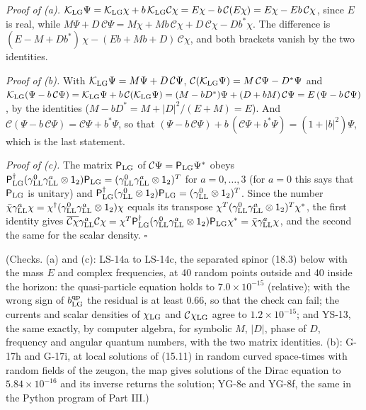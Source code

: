 \documentclass[
  10pt,
]{article}
\begin{document}
\emph{Proof of (a).}
\(\mathcal K_{\rm LG}\Psi=\mathcal K_{\rm LG}\chi+b\,\mathcal K_{\rm LG}\mathcal C\chi=E\chi-b\,\mathcal C(E\chi)=E\chi-Eb\,\mathcal C\chi\),
since \(E\) is real, while
\(M\Psi+D\,\mathcal C\Psi=M\chi+Mb\,\mathcal C\chi+D\,\mathcal C\chi-Db^*\chi\).
The difference is \((E-M+Db^*)\,\chi-(Eb+Mb+D)\,\mathcal C\chi\), and
both brackets vanish by the two identities.

\emph{Proof of (b).} With
\(\mathcal K_{\rm LG}\Psi=M\Psi+D\,\mathcal C\Psi\),
\(\mathcal C(\mathcal K_{\rm LG}\Psi)=M\,\mathcal C\Psi-D^*\Psi\) and
\(\mathcal K_{\rm LG}(\Psi-b\,\mathcal C\Psi)=\mathcal K_{\rm LG}\Psi+b\,\mathcal C(\mathcal K_{\rm LG}\Psi)=(M-bD^*)\Psi+(D+bM)\,\mathcal C\Psi=E\,(\Psi-b\,\mathcal C\Psi)\),
by the identities (\(M-bD^*=M+\lvert D\rvert^2/(E+M)=E\)). And
\(\mathcal C(\Psi-b\,\mathcal C\Psi)=\mathcal C\Psi+b^*\Psi\), so that
\((\Psi-b\,\mathcal C\Psi)+b\,(\mathcal C\Psi+b^*\Psi)=(1+\lvert b\rvert^2)\Psi\),
which is the last statement.

\emph{Proof of (c).} The matrix \(\mathsf P_{\rm LG}\) of
\(\mathcal C\Psi=\mathsf P_{\rm LG}\Psi^*\) obeys
\(\mathsf P_{\rm LG}^\dagger(\gamma^0_{\rm LL}\gamma^a_{\rm LL}\otimes\mathsf 1_2)\mathsf P_{\rm LG}=(\gamma^0_{\rm LL}\gamma^a_{\rm LL}\otimes\mathsf 1_2)^T\)
for \(a=0,\dots,3\) (for \(a=0\) this says that \(\mathsf P_{\rm LG}\)
is unitary) and
\(\mathsf P_{\rm LG}^\dagger(\gamma^0_{\rm LL}\otimes\mathsf 1_2)\mathsf P_{\rm LG}=(\gamma^0_{\rm LL}\otimes\mathsf 1_2)^T\).
Since the number
\(\bar\chi\gamma^a_{\rm LL}\chi=\chi^\dagger(\gamma^0_{\rm LL}\gamma^a_{\rm LL}\otimes\mathsf 1_2)\chi\)
equals its transpose
\(\chi^T(\gamma^0_{\rm LL}\gamma^a_{\rm LL}\otimes\mathsf 1_2)^T\chi^*\),
the first identity gives
\(\overline{\mathcal C\chi}\gamma^a_{\rm LL}\mathcal C\chi=\chi^T\mathsf P_{\rm LG}^\dagger(\gamma^0_{\rm LL}\gamma^a_{\rm LL}\otimes\mathsf 1_2)\mathsf P_{\rm LG}\chi^*=\bar\chi\gamma^a_{\rm LL}\chi\),
and the second the same for the scalar density. \(\square\)

(Checks. (a) and (c): LS-14a to LS-14c, the separated spinor (18.3)
below with the mass \(E\) and complex frequencies, at 40 random points
outside and 40 inside the horizon: the quasi-particle equation holds to
\(7.0\times10^{-15}\) (relative); with the wrong sign of
\(b^{\rm qp}_{\rm LG}\) the residual is at least \(0.66\), so that the
check can fail; the currents and scalar densities of \(\chi_{\rm LG}\)
and \(\mathcal C\chi_{\rm LG}\) agree to \(1.2\times10^{-15}\); and
YS-13, the same exactly, by computer algebra, for symbolic \(M\),
\(\lvert D\rvert\), phase of \(D\), frequency and angular quantum
numbers, with the two matrix identities. (b): G-17h and G-17i, at local
solutions of (15.11) in random curved space-times with random fields of
the zeugon, the map gives solutions of the Dirac equation to
\(5.84\times10^{-16}\) and its inverse returns the solution; YG-8e and
YG-8f, the same in the Python program of Part III.)
\end{document}
